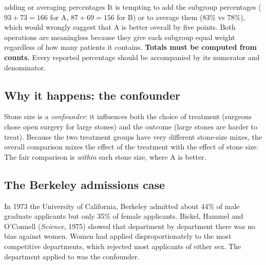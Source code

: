 \documentclass[11pt]{article}
\begin{document}
\begin{pitfall}{adding or averaging percentages}
It is tempting to add the subgroup percentages ($93+73=166$ for A, $87+69=156$ for B) or to average them ($83\%$ vs $78\%$), which would wrongly suggest that A is better overall by five points. Both operations are meaningless because they give each subgroup equal weight regardless of how many patients it contains. \textbf{Totals must be computed from counts.} Every reported percentage should be accompanied by its numerator and denominator.
\end{pitfall}

\begin{center}\end{center}

\subsection{Why it happens: the confounder}
Stone size is a \emph{confounder}: it influences both the choice of treatment (surgeons chose open surgery for large stones) and the outcome (large stones are harder to treat). Because the two treatment groups have very different stone-size mixes, the overall comparison mixes the effect of the treatment with the effect of stone size. The fair comparison is \emph{within} each stone size, where A is better.

\subsection{The Berkeley admissions case}
In 1973 the University of California, Berkeley admitted about 44\% of male graduate applicants but only 35\% of female applicants. Bickel, Hammel and O'Connell (\textit{Science}, 1975) showed that department by department there was no bias against women. Women had applied disproportionately to the most competitive departments, which rejected most applicants of either sex. The department applied to was the confounder.
\end{document}
